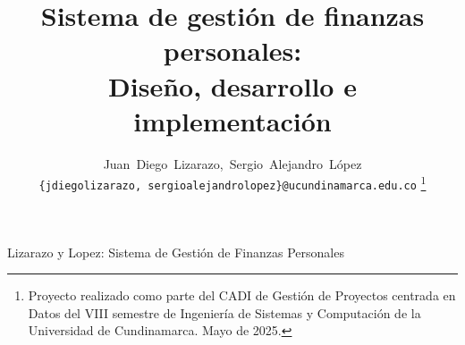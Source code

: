 \documentclass[journal]{IEEEtran}
\begin{document}
%
\title{Sistema de gestión de finanzas personales: \\ Diseño, desarrollo e implementación}
%
%
%

\author{Juan~Diego~Lizarazo,~Sergio~Alejandro~López%
  \\
  {\texttt{\{jdiegolizarazo, sergioalejandrolopez\}@ucundinamarca.edu.co}}
\thanks{Proyecto realizado como parte del CADI de Gestión de Proyectos centrada en Datos del VIII semestre de Ingeniería de Sistemas y Computación de la Universidad de Cundinamarca. Mayo de 2025.}}

%
%

%
{Lizarazo y Lopez: Sistema de Gestión de Finanzas Personales}
%
\end{document}
